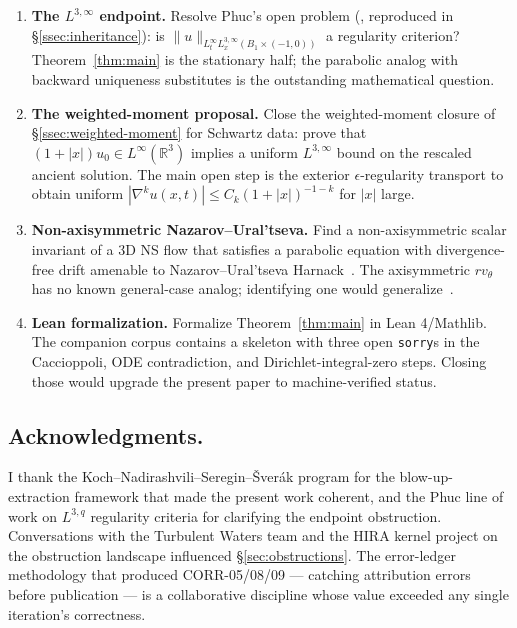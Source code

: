 \documentclass[11pt]{amsart}
\theoremstyle{definition}
\newcommand{\RR}{\mathbb{R}}
\newcommand{\norm}[1]{\|#1\|}
\newcommand{\abs}[1]{|#1|}
\begin{document}
\begin{enumerate}[label=(P\arabic*), itemsep=2pt]
\item \textbf{The $L^{3,\infty}$ endpoint.} Resolve Phuc's open
problem (\cite{Phuc2015}, reproduced in \S\ref{ssec:inheritance}):
is $\norm{u}_{L^\infty_t L^{3,\infty}_x(B_1 \times (-1, 0))}$ a
regularity criterion? Theorem~\ref{thm:main} is the stationary
half; the parabolic analog with backward uniqueness substitutes
is the outstanding mathematical question.
\item \textbf{The weighted-moment proposal.} Close the
weighted-moment closure of \S\ref{ssec:weighted-moment} for
Schwartz data: prove that $(1 + \abs{x})u_0 \in L^\infty(\RR^3)$
implies a uniform $L^{3,\infty}$ bound on the rescaled ancient
solution. The main open step is the exterior
$\epsilon$-regularity transport to obtain uniform $\abs{\nabla^k
u(x, t)} \leq C_k (1 + \abs{x})^{-1-k}$ for $\abs{x}$ large.
\item \textbf{Non-axisymmetric Nazarov--Ural'tseva.} Find a
non-axisymmetric scalar invariant of a 3D NS flow that satisfies
a parabolic equation with divergence-free drift amenable to
Nazarov--Ural'tseva Harnack~\cite{NazarovUraltseva}. The
axisymmetric $rv_\theta$ has no known general-case analog;
identifying one would generalize~\cite{OzanskiPalasek}.
\item \textbf{Lean formalization.} Formalize
Theorem~\ref{thm:main} in Lean 4/Mathlib. The companion corpus
\cite{CompanionCorpus} contains a skeleton with three open
\texttt{sorry}s in the Caccioppoli, ODE contradiction, and
Dirichlet-integral-zero steps. Closing those would upgrade the
present paper to machine-verified status.
\end{enumerate}

\subsection{Acknowledgments.}

I thank the Koch--Nadirashvili--Seregin--\v{S}ver\'ak program
for the blow-up-extraction framework that made the present work
coherent, and the Phuc line of work on $L^{3,q}$ regularity
criteria for clarifying the endpoint obstruction. Conversations
with the Turbulent Waters team and the HIRA kernel project on
the obstruction landscape influenced \S\ref{sec:obstructions}.
The error-ledger methodology that produced CORR-05/08/09
\cite{CompanionCorpus} --- catching attribution errors before
publication --- is a collaborative discipline whose value
exceeded any single iteration's correctness.
\end{document}
